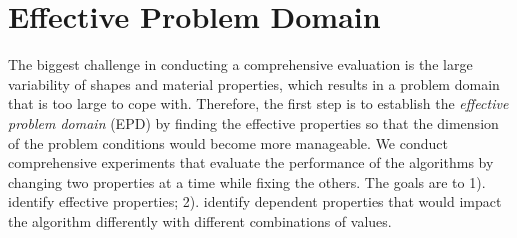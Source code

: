 
\section{Effective Problem Domain}
The biggest challenge in conducting a comprehensive evaluation is the large variability of shapes and material properties, which results in a problem domain that is too large to cope with. Therefore, the first step is to establish the \textit{effective problem domain} (EPD) by finding the effective properties so that the dimension of the problem conditions would become more manageable. We conduct comprehensive experiments that evaluate the performance of the algorithms by changing two properties at a time while fixing the others. The goals are to 1). identify effective properties; 2). identify dependent properties that would impact the algorithm differently with different combinations of values.

